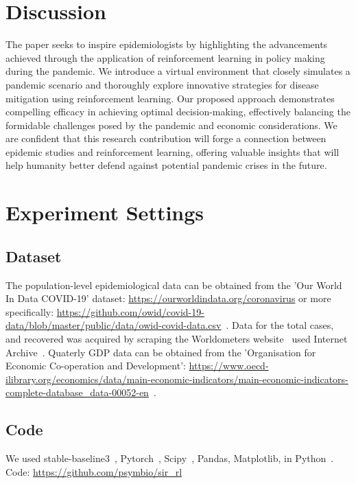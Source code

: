 \documentclass[tikz,fleqn,12pt]{wlscirep}
\begin{document}
\section{Discussion}
The paper seeks to inspire epidemiologists by highlighting the advancements achieved through the application of reinforcement learning in policy making during the pandemic. We introduce a virtual environment that closely simulates a pandemic scenario and thoroughly explore innovative strategies for disease mitigation using reinforcement learning. Our proposed approach demonstrates compelling efficacy in achieving optimal decision-making, effectively balancing the formidable challenges posed by the pandemic and economic considerations. We are confident that this research contribution will forge a connection between epidemic studies and reinforcement learning, offering valuable insights that will help humanity better defend against potential pandemic crises in the future.

\section{Experiment Settings}
\subsection{Dataset}
The population-level epidemiological data can be obtained from the 'Our World In Data COVID-19' dataset: \url{https://ourworldindata.org/coronavirus} or more specifically: \url{https://github.com/owid/covid-19-data/blob/master/public/data/owid-covid-data.csv}~\cite{owidcoronavirus}. Data for the total cases, and recovered was acquired by scraping the Worldometers website~\cite{WorldometerCorona} used Internet Archive~\cite{InternetArchive}. Quaterly GDP data can be obtained from the 'Organisation for Economic Co-operation and Development': \url{https://www.oecd-ilibrary.org/economics/data/main-economic-indicators/main-economic-indicators-complete-database_data-00052-en}~\cite{economic_indicators_data}.

\subsection{Code}
We used stable-baseline3~\cite{JMLR:v22:20-1364}, Pytorch~\cite{paszke2019pytorch}, Scipy~\cite{Virtanen_2020}, Pandas, Matplotlib, in Python~\cite{ScientificPython}.
Code: \url{https://github.com/psymbio/sir_rl}
% 
% 

\end{document}
